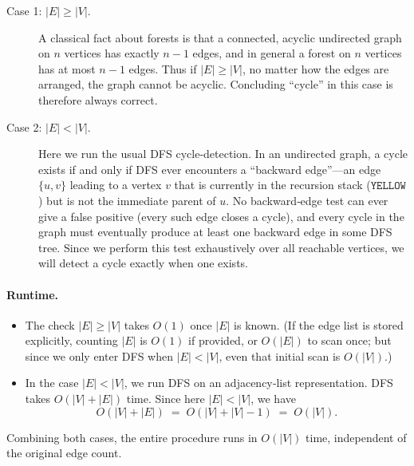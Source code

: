 \documentclass[11pt]{article}
\begin{document}
    \begin{description}
      \item[Case 1: \(\lvert E\rvert \ge \lvert V\rvert\).]  
        A classical fact about forests is that a connected, acyclic undirected graph on \(n\) vertices has exactly \(n-1\) edges, and in general a forest on \(n\) vertices has at most \(n-1\) edges.  Thus if \(\lvert E\rvert \ge \lvert V\rvert\), no matter how the edges are arranged, the graph cannot be acyclic.  Concluding “cycle” in this case is therefore always correct.
    
      \item[Case 2: \(\lvert E\rvert < \lvert V\rvert\).]  
        Here we run the usual DFS cycle‐detection.  In an undirected graph, a cycle exists if and only if DFS ever encounters a “backward edge”—an edge \(\{u,v\}\) leading to a vertex \(v\) that is currently in the recursion stack (\(\texttt{YELLOW}\)) but is not the immediate parent of \(u\).  No backward‐edge test can ever give a false positive (every such edge closes a cycle), and every cycle in the graph must eventually produce at least one backward edge in some DFS tree.  Since we perform this test exhaustively over all reachable vertices, we will detect a cycle exactly when one exists.
    \end{description}
    
    \paragraph{Runtime.}  
    \begin{itemize}
      \item The check \(\lvert E\rvert \ge \lvert V\rvert\) takes \(O(1)\) once \(\lvert E\rvert\) is known.  (If the edge list is stored explicitly, counting \(\lvert E\rvert\) is \(O(1)\) if provided, or \(O(\lvert E\rvert)\) to scan once; but since we only enter DFS when \(\lvert E\rvert<\lvert V\rvert\), even that initial scan is \(O(\lvert V\rvert)\).)
      \item In the case \(\lvert E\rvert<\lvert V\rvert\), we run DFS on an adjacency‐list representation.  DFS takes \(O(\lvert V\rvert + \lvert E\rvert)\) time.
        Since here \(\lvert E\rvert<\lvert V\rvert\), we have
        \[
          O(\lvert V\rvert + \lvert E\rvert) \;=\; O(\lvert V\rvert + \lvert V\rvert - 1)\;=\;O(\lvert V\rvert).
        \]
    \end{itemize}
    
    Combining both cases, the entire procedure runs in \(O(\lvert V\rvert)\) time, independent of the original edge count.
    
\end{document}
